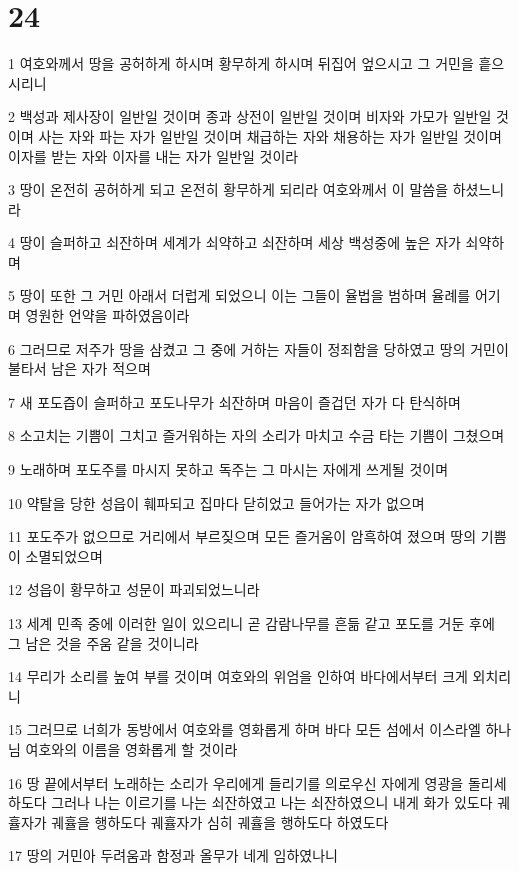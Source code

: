 \chapter{24}

\par 1 여호와께서 땅을 공허하게 하시며 황무하게 하시며 뒤집어 엎으시고 그 거민을 흩으시리니
\par 2 백성과 제사장이 일반일 것이며 종과 상전이 일반일 것이며 비자와 가모가 일반일 것이며 사는 자와 파는 자가 일반일 것이며 채급하는 자와 채용하는 자가 일반일 것이며 이자를 받는 자와 이자를 내는 자가 일반일 것이라
\par 3 땅이 온전히 공허하게 되고 온전히 황무하게 되리라 여호와께서 이 말씀을 하셨느니라
\par 4 땅이 슬퍼하고 쇠잔하며 세계가 쇠약하고 쇠잔하며 세상 백성중에 높은 자가 쇠약하며
\par 5 땅이 또한 그 거민 아래서 더럽게 되었으니 이는 그들이 율법을 범하며 율례를 어기며 영원한 언약을 파하였음이라
\par 6 그러므로 저주가 땅을 삼켰고 그 중에 거하는 자들이 정죄함을 당하였고 땅의 거민이 불타서 남은 자가 적으며
\par 7 새 포도즙이 슬퍼하고 포도나무가 쇠잔하며 마음이 즐겁던 자가 다 탄식하며
\par 8 소고치는 기쁨이 그치고 즐거워하는 자의 소리가 마치고 수금 타는 기쁨이 그쳤으며
\par 9 노래하며 포도주를 마시지 못하고 독주는 그 마시는 자에게 쓰게될 것이며
\par 10 약탈을 당한 성읍이 훼파되고 집마다 닫히었고 들어가는 자가 없으며
\par 11 포도주가 없으므로 거리에서 부르짖으며 모든 즐거움이 암흑하여 졌으며 땅의 기쁨이 소멸되었으며
\par 12 성읍이 황무하고 성문이 파괴되었느니라
\par 13 세계 민족 중에 이러한 일이 있으리니 곧 감람나무를 흔듦 같고 포도를 거둔 후에 그 남은 것을 주움 같을 것이니라
\par 14 무리가 소리를 높여 부를 것이며 여호와의 위엄을 인하여 바다에서부터 크게 외치리니
\par 15 그러므로 너희가 동방에서 여호와를 영화롭게 하며 바다 모든 섬에서 이스라엘 하나님 여호와의 이름을 영화롭게 할 것이라
\par 16 땅 끝에서부터 노래하는 소리가 우리에게 들리기를 의로우신 자에게 영광을 돌리세 하도다 그러나 나는 이르기를 나는 쇠잔하였고 나는 쇠잔하였으니 내게 화가 있도다 궤휼자가 궤휼을 행하도다 궤휼자가 심히 궤휼을 행하도다 하였도다
\par 17 땅의 거민아 두려움과 함정과 올무가 네게 임하였나니
